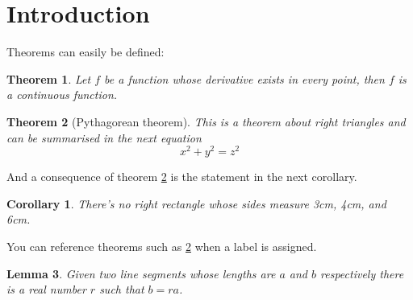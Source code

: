 \documentclass{article}
\newtheorem{theorem}{Theorem}[section]
\newtheorem{corollary}{Corollary}[theorem]
\newtheorem{lemma}[theorem]{Lemma}
\begin{document}
\section{Introduction}
Theorems can easily be defined:

\begin{theorem}
Let \(f\) be a function whose derivative exists in every point, then \(f\) is 
a continuous function.
\end{theorem}

\begin{theorem}[Pythagorean theorem]
\label{pythagorean}
This is a theorem about right triangles and can be summarised in the next 
equation 
\[ x^2 + y^2 = z^2 \]
\end{theorem}

And a consequence of theorem \ref{pythagorean} is the statement in the next 
corollary.

\begin{corollary}
There's no right rectangle whose sides measure 3cm, 4cm, and 6cm.
\end{corollary}

You can reference theorems such as \ref{pythagorean} when a label is assigned.

\begin{lemma}
Given two line segments whose lengths are \(a\) and \(b\) respectively there is a 
real number \(r\) such that \(b=ra\).
\end{lemma}
\end{document}
